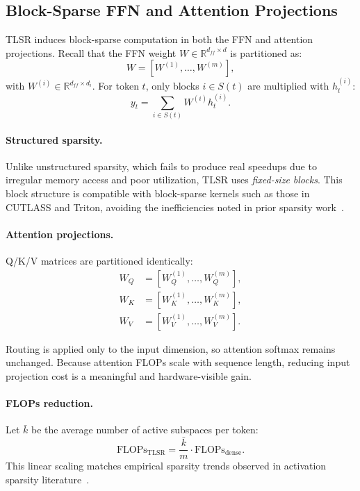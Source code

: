 \documentclass{article}
\theoremstyle{plain}
\theoremstyle{definition}
\theoremstyle{remark}
\begin{document}
\subsection{Block-Sparse FFN and Attention Projections}

TLSR induces block-sparse computation in both the FFN and attention projections.
Recall that the FFN weight $W \in \mathbb{R}^{d_{ff} \times d}$ is partitioned as:
\[
W = [ W^{(1)}, \ldots, W^{(m)} ],
\]
with $W^{(i)} \in \mathbb{R}^{d_{ff} \times d_i}$.
For token $t$, only blocks $i \in S(t)$ are multiplied with $h_t^{(i)}$:
\[
y_t = \sum_{i \in S(t)} W^{(i)} h_t^{(i)}.
\]

\paragraph{Structured sparsity.}
Unlike unstructured sparsity, which fails to produce real speedups
due to irregular memory access and poor utilization,
TLSR uses \emph{fixed-size blocks}.
This block structure is compatible with block-sparse kernels such as those in
CUTLASS and Triton, avoiding the inefficiencies noted in
prior sparsity work~\cite{fang2024maskllm,zheng2024readme}.

\paragraph{Attention projections.}
Q/K/V matrices are partitioned identically:
\begin{equation*}
\begin{aligned}
W_Q &= [W_Q^{(1)},\dots,W_Q^{(m)}], \\
W_K &= [W_K^{(1)},\dots,W_K^{(m)}], \\
W_V &= [W_V^{(1)},\dots,W_V^{(m)}].
\end{aligned}
\end{equation*}

Routing is applied only to the input dimension,
so attention softmax remains unchanged.
Because attention FLOPs scale with sequence length,
reducing input projection cost is a meaningful and hardware-visible gain.

\paragraph{FLOPs reduction.}
Let $\bar{k}$ be the average number of active subspaces per token:
\[
\mathrm{FLOPs}_{\text{TLSR}} = \frac{\bar{k}}{m} \cdot
\mathrm{FLOPs}_{\text{dense}}.
\]
This linear scaling matches empirical sparsity trends observed in
activation sparsity literature~\cite{li2023lazyneuron,liu2025teal}.
\end{document}
